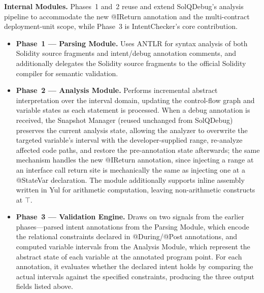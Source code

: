 \documentclass[pdflatex,sn-basic]{sn-jnl}%
\theoremstyle{thmstyleone}%
\theoremstyle{thmstyletwo}%
\theoremstyle{thmstylethree}%
\begin{document}
\smallskip
\noindent\textbf{Internal Modules.}
Phases~1 and~2 reuse and extend SolQDebug's analysis pipeline to accommodate the new @IReturn annotation and the multi-contract deployment-unit scope, while Phase~3 is IntentChecker's core contribution.
\begin{itemize}
    \item \textbf{Phase~1 --- Parsing Module.} Uses ANTLR for syntax analysis of both Solidity source fragments and intent/debug annotation comments, and additionally delegates the Solidity source fragments to the official Solidity compiler for semantic validation.
    \item \textbf{Phase~2 --- Analysis Module.} Performs incremental abstract interpretation over the interval domain, updating the control-flow graph and variable states as each statement is processed. When a debug annotation is received, the Snapshot Manager (reused unchanged from SolQDebug) preserves the current analysis state, allowing the analyzer to overwrite the targeted variable's interval with the developer-supplied range, re-analyze affected code paths, and restore the pre-annotation state afterwards; the same mechanism handles the new @IReturn annotation, since injecting a range at an interface call return site is mechanically the same as injecting one at a @StateVar declaration. The module additionally supports inline assembly written in Yul for arithmetic computation, leaving non-arithmetic constructs at $\top$.
    \item \textbf{Phase~3 --- Validation Engine.} Draws on two signals from the earlier phases---parsed intent annotations from the Parsing Module, which encode the relational constraints declared in @During/@Post annotations, and computed variable intervals from the Analysis Module, which represent the abstract state of each variable at the annotated program point. For each annotation, it evaluates whether the declared intent holds by comparing the actual intervals against the specified constraints, producing the three output fields listed above.
\end{itemize}
\end{document}
